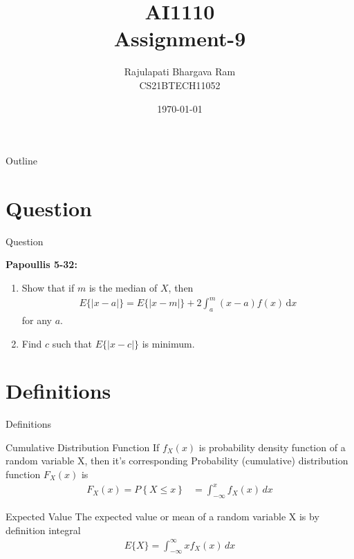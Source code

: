 \documentclass{beamer}
\title{AI1110 \\ Assignment-9}
\author{Rajulapati Bhargava Ram \\ CS21BTECH11052}
\date{\today}
\providecommand{\cbrak}[1]{\ensuremath{\left\{#1\right\}}}
\begin{document}
\begin{frame}
    \titlepage 
\end{frame}
\logo{}


\begin{frame}{Outline}
    \tableofcontents
\end{frame}



\section{Question}
\begin{frame}{Question}
    \begin{block}{\textbf{Papoullis 5-32:} } 
       \begin{enumerate}[label=(\alph*)]
          \item Show that if $m$ is the median of $X$, then
              \begin{align}
                 E\{|x-a|\} = E\{|x-m|\} + 2\int_a^m \! (x-a)f(x) \, \mathrm{d}x  
              \end{align}
              for any $a$.
          \item Find $c$ such that $E\{|x-c|\}$ is minimum.
       \end{enumerate}
     \end{block}
     
\end{frame}


\section{Definitions}
\begin{frame}{Definitions}
   \begin{block}{Cumulative Distribution Function}
      If $f_X(x)$ is probability density function of a random variable X, then it's corresponding Probability (cumulative) distribution function $F_X(x)$ is 
     \begin{align}
        F_X(x) = P\cbrak{X \le x}
              &= \int_{-\infty}^{x} f_X(x) \, dx \label{eq2} 
     \end{align}
   \end{block}	

	\begin{block}{Expected Value}
	   The expected value or mean of a random variable X is by definition integral
	   \begin{align}
	      E\{X\} = \int_{-\infty}^{\infty} xf_X(x) \, dx \label{eq3}
	   \end{align}
	\end{block}

\end{frame}
\end{document}
